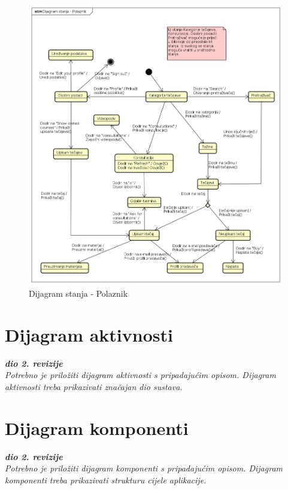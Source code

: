 			\begin{figure}[h]
				\includegraphics[scale=0.5]{dijagrami/Dijagram_stanja.PNG}
				\centering
				\caption{Dijagram stanja - Polaznik}
				\label{fig:Dijagram_stanja}
			\end{figure}
		
		
			\eject 
		
		\section{Dijagram aktivnosti}
			
			\textbf{\textit{dio 2. revizije}}\\
			
			 \textit{Potrebno je priložiti dijagram aktivnosti s pripadajućim opisom. Dijagram aktivnosti treba prikazivati značajan dio sustava.}
			
			\eject
		\section{Dijagram komponenti}
		
			\textbf{\textit{dio 2. revizije}}\\
		
			 \textit{Potrebno je priložiti dijagram komponenti s pripadajućim opisom. Dijagram komponenti treba prikazivati strukturu cijele aplikacije.}